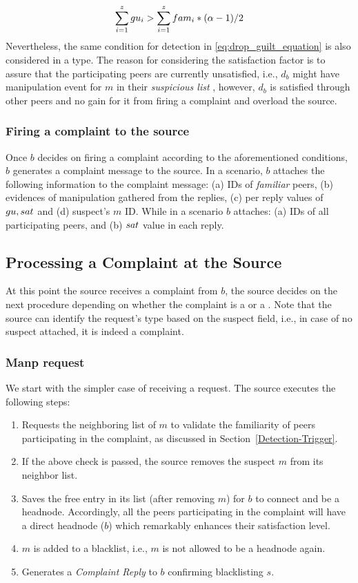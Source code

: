 \begin{align}
\label{eq:drop_guilt_equation}
\sum_{i=1}^{z} \guilt_i > \sum_{i=1}^{z} \fami_i*(\alpha-1)/2
\end{align}
Nevertheless, the same condition for \drop detection in \ref{eq:drop_guilt_equation} is also considered in a \manp type.
The reason for considering the satisfaction factor is to assure that the participating peers are currently unsatisfied, i.e., $d_b$ might have manipulation event for $m$ in their \textit{suspicious list} , however, $d_b$ is satisfied through other peers and no gain for it from firing a complaint and overload the source.

\subsubsection*{Firing a complaint to the source}

Once $b$ decides on firing a complaint according to the aforementioned conditions, $b$ generates a complaint message to the source.
In a \manp scenario, $b$ attaches the following information to the complaint message: (a) IDs of \textit{familiar} peers, (b) evidences of manipulation gathered from the replies, (c) per reply values of $gu,sat$ and (d) suspect's $m$ ID.
While in a \drop scenario $b$ attaches: (a) IDs of all participating peers, and (b) $sat$ value in each reply.

\subsection{Processing a Complaint at the Source}
\label{complaint_source}
At this point the source receives a complaint from $b$, the source decides on the next procedure depending on whether the complaint is a \drop or a \manp.
Note that the source can identify the request's type based on the suspect field, i.e., in case of no suspect attached, it is indeed a \drop complaint.

\subsubsection*{Manp request}
We start with the simpler case of receiving a \manp request. 
The source executes the following steps:
\begin{enumerate}
 \item Requests the neighboring list of $m$ to validate the familiarity of peers participating in the complaint, as discussed in Section~\ref{Detection-Trigger}.
 \item If the above check is passed, the source removes the suspect $m$ from its neighbor list.
 \item Saves the free entry in its list (after removing $m$) for $b$ to connect and be a headnode.
 Accordingly, all the peers participating in the complaint will have a direct headnode ($b$) which remarkably enhances their satisfaction level.
 \item $m$ is added to a blacklist, i.e., $m$ is not allowed to be a headnode again.
 \item Generates a \textit{Complaint Reply} to $b$ confirming blacklisting $s$.
\end{enumerate}

